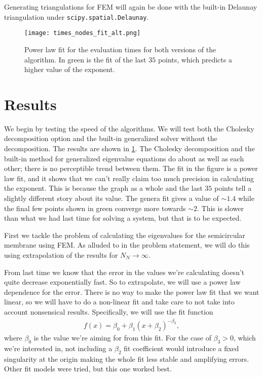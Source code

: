 \documentclass[10pt,a4paper,twocolumn]{article}
\begin{document}
Generating triangulations for FEM will again be done with the built-in Delaunay triangulation under \texttt{scipy.spatial.Delaunay}.


\begin{figure}[!t]
    \centering
    \texttt{[image: times\_nodes\_fit\_alt.png]}
    \caption{Power law fit for the evaluation times for both versions of the algorithm. In green is the fit of the last $35$ points, which predicts a higher value of the exponent.}
    \label{fig:times_fit}
\end{figure}


\section{Results}

We begin by testing the speed of the algorithms. We will test both the Cholesky decomposition option and the built-in generalized solver without the decomposition. The results are shown in \cref{fig:times_fit}. The Cholesky decomposition and the built-in method for generalized eigenvalue equations do about as well as each other; there is no perceptible trend between them. The fit in the figure is a power law fit, and it shows that we can't really claim too much precision in calculating the exponent. This is because the graph as a whole and the last $35$ points tell a slightly different story about its value. The genera fit gives a value of $\sim\! 1.4$ while the final few points shown in green converge more towards $\sim\!2$. This is slower than what we had last time for solving a system, but that is to be expected.


First we tackle the problem of calculating the eigenvalues for the semicircular membrane using FEM. As alluded to in the problem statement, we will do this using extrapolation of the results for $N_N \rightarrow \infty$.

From last time we know that the error in the values we're calculating doesn't quite decrease exponentially fast. So to extrapolate, we will use a power law dependence for the error.  There is no way to make the power law fit that we want linear, so we will have to do a non-linear fit and take care to not take into account nonsensical results. Specifically, we will use the fit function
%
\begin{align}
    f(x) = \beta_0 + \beta_1 (x + \beta_2)^{-\beta_3},
\end{align}
%
where $\beta_0$ is the value we're aiming for from this fit. For the case of $\beta_3 > 0$, which we're interested in, not including a $\beta_2$ fit coefficient would introduce a fixed singularity at the origin making the whole fit less stable and amplifying errors. Other fit models were tried, but this one worked best.
\end{document}
